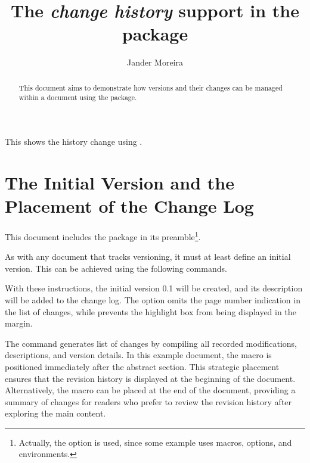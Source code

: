 \documentclass[a4paper, 11pt]{article}
\title{The \textit{change history} support in the \PackageName{docs} package}
\author{Jander Moreira}
\date{}
\begin{document}
\maketitle

\begin{abstract}
    This document aims to demonstrate how versions and their changes can be managed within a document using the  package.
\end{abstract}

\noindent This shows the history change using .

\DocsPrintChanges


\section{The Initial Version and the Placement of the Change Log}

This document includes the  package in its preamble\footnote{Actually, the  option is used, since some example uses macros, options, and environments.}.

\begin{DocsListing}
    \usepackage{docs}
\end{DocsListing}

As with any document that tracks versioning, it must at least define an initial version. This can be achieved using the following commands.

%
\begin{DocsListing}
\end{DocsListing}

With these instructions, the initial version 0.1 will be created, and its description will be added to the change log. The  option omits the page number indication in the list of changes, while  prevents the highlight box from being displayed in the margin.

The  command generates list of changes by compiling all recorded modifications, descriptions, and version details. In this example document, the macro is positioned immediately after the abstract section. This strategic placement ensures that the revision history is displayed at the beginning of the document. Alternatively, the macro can be placed at the end of the document, providing a summary of changes for readers who prefer to review the revision history after exploring the main content.
\end{document}
